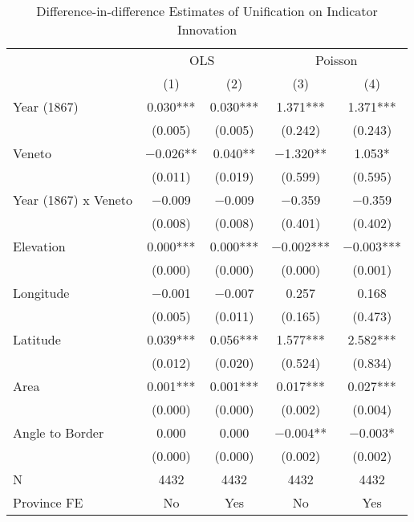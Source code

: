 \begin{table}[!h]

\caption{\label{tab:did_analysis_dummy}Difference-in-difference Estimates of Unification on Indicator Innovation}
\centering
\fontsize{9}{11}\selectfont
\begin{threeparttable}
\begin{tabular}[t]{lcccc}
\toprule
\multicolumn{1}{c}{ } & \multicolumn{2}{c}{OLS} & \multicolumn{2}{c}{Poisson} \\
\cmidrule(l{3pt}r{3pt}){2-3} \cmidrule(l{3pt}r{3pt}){4-5}
  & (1) & (2) & (3) & (4)\\
\midrule
Year (1867) & \num{0.030}*** & \num{0.030}*** & \num{1.371}*** & \num{1.371}***\\
 & (\num{0.005}) & (\num{0.005}) & (\num{0.242}) & (\num{0.243})\\
Veneto & \num{-0.026}** & \num{0.040}** & \num{-1.320}** & \num{1.053}*\\
 & (\num{0.011}) & (\num{0.019}) & (\num{0.599}) & (\num{0.595})\\
Year (1867) x Veneto & \num{-0.009} & \num{-0.009} & \num{-0.359} & \num{-0.359}\\
 & (\num{0.008}) & (\num{0.008}) & (\num{0.401}) & (\num{0.402})\\
Elevation & \num{0.000}*** & \num{0.000}*** & \num{-0.002}*** & \num{-0.003}***\\
 & (\num{0.000}) & (\num{0.000}) & (\num{0.000}) & (\num{0.001})\\
Longitude & \num{-0.001} & \num{-0.007} & \num{0.257} & \num{0.168}\\
 & (\num{0.005}) & (\num{0.011}) & (\num{0.165}) & (\num{0.473})\\
Latitude & \num{0.039}*** & \num{0.056}*** & \num{1.577}*** & \num{2.582}***\\
 & (\num{0.012}) & (\num{0.020}) & (\num{0.524}) & (\num{0.834})\\
Area & \num{0.001}*** & \num{0.001}*** & \num{0.017}*** & \num{0.027}***\\
 & (\num{0.000}) & (\num{0.000}) & (\num{0.002}) & (\num{0.004})\\
Angle to Border & \num{0.000} & \num{0.000} & \num{-0.004}** & \num{-0.003}*\\
 & (\num{0.000}) & (\num{0.000}) & (\num{0.002}) & (\num{0.002})\\
\midrule
N & \num{4432} & \num{4432} & \num{4432} & \num{4432}\\
Province FE & No & Yes & No & Yes\\

\end{tabular}
\end{threeparttable}
\end{table}
